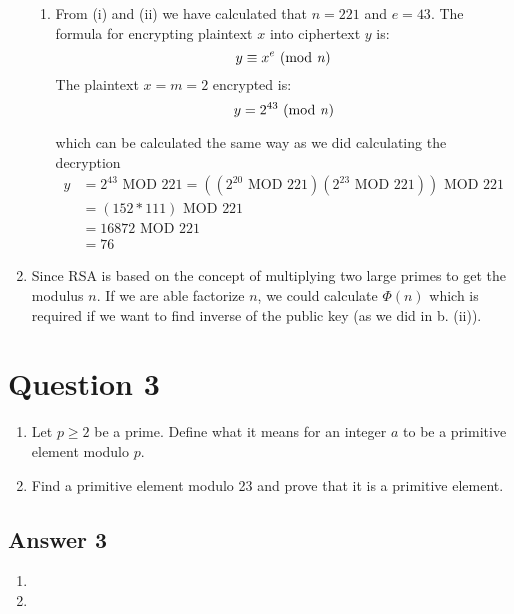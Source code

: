 \documentclass{article}
\begin{document}
\begin{enumerate}
\begin{enumerate}
			\item From (i) and (ii) we have calculated that $n=221$ and $e=43$. The formula for encrypting plaintext $x$ into ciphertext $y$ is:
			$$
			y \equiv x^e \text{ (mod \textit{n})}
			$$ 
			The plaintext $x = m = 2$ encrypted is:
			$$
			y=2^{43} \text{ (mod \textit{n})}
			$$
			
			which can be calculated the same way as we did calculating the decryption
			\[
			\begin{split}
			y&=2^{43} \text{ MOD } 221 = ((2^{20} \text{ MOD } 221)(2^{23} \text{ MOD } 221)) \text{ MOD } 221\\
			&=(152*111) \text{ MOD } 221\\
			&=16872 \text{ MOD } 221\\
			&=76
			\end{split}
			\]
			
		\end{enumerate}
		
		\item Since RSA is based on the concept of multiplying two large primes to get the modulus $n$. If we are able factorize $n$, we could calculate $\Phi(n)$ which is required if we want to find inverse of the public key (as we did in b. (ii)). 
	\end{enumerate}	

	\medspace

	\section*{Question 3}
	\renewcommand{\theenumi}{\alph{enumi}}
	\begin{enumerate}
		\item Let $p \ge 2$ be a prime. Define what it means for an integer $a$ to be a primitive element modulo $p$.
		
		\item Find a primitive element modulo 23 and prove that it is a primitive element.
	\end{enumerate}	

	\subsection*{Answer 3}
	\renewcommand{\theenumi}{\alph{enumi}}
	\begin{enumerate}
		\item 
		
		\item 
	\end{enumerate}	
		
\end{document}
